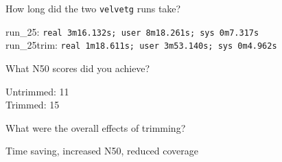 \begin{questions}
How long did the two \texttt{velvetg} runs take?
\begin{answer}
run\_25:      \texttt{real    3m16.132s; user    8m18.261s; sys     0m7.317s}\\
run\_25trim:  \texttt{real    1m18.611s; user    3m53.140s; sys     0m4.962s}
\end{answer}

What N50 scores did you achieve?
\begin{answer}
Untrimmed: 11\\
Trimmed: 15
\end{answer}

What were the overall effects of trimming?
\begin{answer}
Time saving, increased N50, reduced coverage
\end{answer}
\end{questions}

